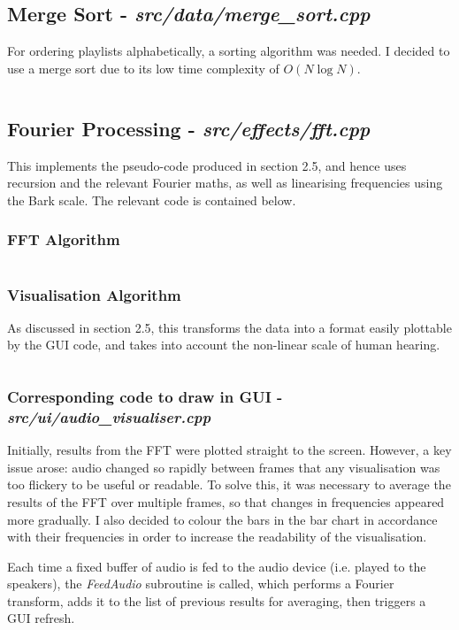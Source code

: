\pagebreak
\subsection{Merge Sort - \textit{src/data/merge\_sort.cpp}}
For ordering playlists alphabetically, a sorting  algorithm was needed. I decided to use a merge sort due to its low time complexity of \(O(N \log{N})\).
\inputminted[linenos]{c++}{../src/data/merge_sort.cpp}

\pagebreak
\subsection{Fourier Processing - \textit{src/effects/fft.cpp}}
This implements the pseudo-code produced in section 2.5, and hence uses recursion and the relevant Fourier maths, as well as linearising frequencies using the Bark scale. The relevant code is contained below.

\subsubsection{FFT Algorithm}
\inputminted[linenos, firstline=1, lastline=79]{c++}{../src/effects/fft.cpp}

\pagebreak
\subsubsection{Visualisation Algorithm}
As discussed in section 2.5, this transforms the data into a format easily plottable by the GUI code, and takes into account the non-linear scale of human hearing.
\inputminted[linenos, firstline=81, lastline=148]{c++}{../src/effects/fft.cpp}

\pagebreak
\subsubsection{Corresponding code to draw in GUI - \textit{src/ui/audio\_visualiser.cpp}}
Initially, results from the FFT were plotted straight to the screen. However, a key issue arose: audio changed so rapidly between frames that any visualisation was too flickery to be useful or readable.  To solve this, it was necessary to average the results of the FFT over multiple frames, so that changes in frequencies appeared more gradually. I also decided to colour the bars in the bar chart in accordance with their frequencies in order to increase the readability of the visualisation.

Each time a fixed buffer of audio is fed to the audio device (i.e. played to the speakers), the \textit{FeedAudio} subroutine is called, which performs a Fourier transform, adds it to the list of previous results for averaging, then triggers a GUI refresh.
\inputminted[linenos, firstline=15, lastline=44]{c++}{../src/ui/audio_visualiser.cpp}
\inputminted[linenos, firstline=67, lastline=156]{c++}{../src/ui/audio_visualiser.cpp}


